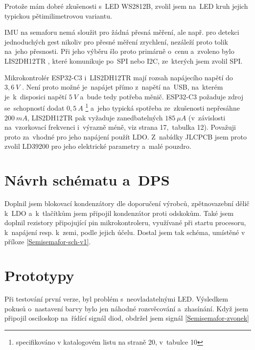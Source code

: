 Protože mám dobré zkušenosti s~LED WS2812B, zvolil jsem na~LED kruh jejich typickou pětimilimetrovou variantu.

IMU na semaforu nemá sloužit pro žádná přesná měření, ale např. pro detekci jednoduchých gest nikoliv pro přesné měření zrychlení, nezáleží proto tolik na~jeho přesnosti.
Při jeho výběru šlo proto primárně o~cenu a~zvoleno bylo LIS2DH12TR \cite{LIS2DH12TR}, které komunikuje po~SPI nebo I2C, ze~kterých jsem zvolil SPI.

Mikrokontrolér ESP32-C3 i~LIS2DH12TR mají rozsah napájecího napětí do~\(3,6~V\) \cite{ESP32C3}\cite{LIS2DH12TR}.
Není proto možné je~napájet přímo z~napětí na~USB, na~kterém je~k~disposici napětí \(5~V\) a~bude tedy potřeba měnič.
ESP32-C3 požaduje zdroj se~schopností dodat \(0,5~A\) \footnote{specifikováno v katalogovém listu \cite{ESP32C3} na straně 20, v~tabulce 10} a~jeho typická spotřeba ze~zkušenosti nepřesáhne \(200~mA\), LIS2DH12TR pak vyžaduje zanedbatelných \(185~\mu A\) (v~závislosti na~vzorkovací frekvenci i~výrazně méně, viz \cite{LIS2DH12TR} strana 17,~tabulka 12).
Považuji proto za~vhodné pro jeho napájení použít LDO.
Z~nabídky JLCPCB jsem proto zvolil LD39200 \cite{LD39200} pro jeho elektrické parametry a~malé pouzdro.

\section{Návrh schématu a~DPS}

Doplnil jsem blokovací kondenzátory dle doporučení výrobců, zpětnovazební dělič k~LDO a~k~tlačítkům jsem připojil kondenzátor proti odskokům.
Také jsem doplnil rezistory připojující pin mikrokontroleru, využívané při startu procesoru, k~napájení resp. k~zemi, podle jejich účelu. 
Dostal jsem tak schéma, umístěné v příloze \ref{Semisemafor-sch-v1}.

\section{Prototypy}

Při testování první verze, byl problém s~neovladatelnými LED.
Výsledkem pokusů o~nastavení barvy bylo jen náhodné rozsvěcování a~zhasínání.
Když jsem připojil osciloskop na~řídící signál diod, obdržel jsem signál \ref{Semisemafor-zvonek} %


